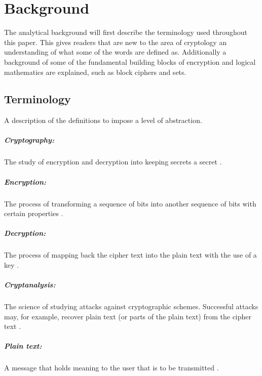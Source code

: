 \documentclass[11pt,a4paper, notitlepage]{report}
\begin{document}
\chapter{Background}
\label{cha:AnBack}

The analytical background will first describe the terminology used throughout this paper. This gives readers that are new to the area of cryptology an understanding of what some of the words are defined as. Additionally a background of some of the fundamental building blocks of encryption and logical mathematics are explained, such as block ciphers and sets. 


\section{Terminology}
\label{sec:Term}

A description of the definitions to impose a level of abstraction.

\paragraph{Cryptography:}
The study of encryption and decryption into keeping secrets a secret \cite{DBLP:series/isc/DelfsK07}.

\paragraph{Encryption:}
The process of transforming a sequence of bits into another sequence of bits with certain properties \cite{Fabio2000LogicalSAT}.

\paragraph{Decryption:}
The process of mapping back the cipher text into the plain text with the use of a key \cite{Fabio2000LogicalSAT}.

\paragraph{Cryptanalysis:}
The science of studying attacks against cryptographic schemes. Successful attacks may, for example, recover plain text (or parts of the plain text) from the cipher text \cite{DBLP:books/sp/Buchmann02}.

\paragraph{Plain text:}
A message that holds meaning to the user that is to be transmitted \cite{DBLP:books/sp/Buchmann02}.
\end{document}
